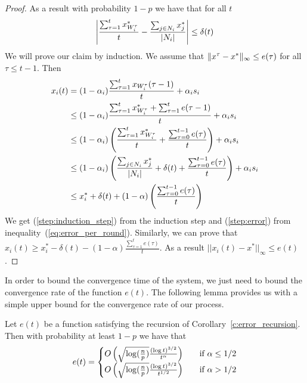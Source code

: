 \begin{proof}
  As a result with probability $1-p$ we have that for all $t$
  \begin{equation}\label{eq:error_per_round}
    \left|
    \frac{\sum_{\tau=1}^t x^*_{W_i^\tau}}{t} -
    \frac{\sum_{j \in N_i} x^*_j}{|N_i|}
    \right| \leq \delta(t)
  \end{equation}
  We will prove our claim by induction.
  We assume that $\| x^{\tau}-x^* \|_{\infty} \leq e(\tau)$ for all
  $\tau \leq t-1$. Then
  \begin{align}
    x_i(t)
    &=
    (1-\alpha_i)\frac{\sum_{\tau=1}^{t}x_{W_i^{\tau}}(\tau-1)}{t}
    + \alpha_i s_i \nonumber \\
    &\leq
    (1-\alpha_i)\frac{\sum_{\tau=1}^{t}x^*_{W_i^{\tau}} +
      \sum_{\tau=1}^{t} e(\tau-1)}{t} + \alpha_i s_i \label{step:induction_step}\\
    &\leq
    (1-\alpha_i)
    \left(
    \frac{\sum_{\tau=1}^{t}x^*_{W_i^{\tau}}}{t}+
    \frac{\sum_{\tau=0}^{t-1} e(\tau)}{t}
    \right)
    + \alpha_i s_i \nonumber\\
    &\leq
    (1-\alpha_i)\left(\frac{\sum_{j \in N_i}x^*_{j}}{|N_i|} +
    \delta(t) + \frac{\sum_{\tau=0}^{t-1} e(\tau)}{t} \right) +
    \alpha_i s_i \label{step:error} \\
    &\leq
    x_i^* + \delta(t) + (1-\alpha)
    \left(
    \frac{\sum_{\tau=0}^{t-1} e(\tau)}{t}
    \right)
    \nonumber
  \end{align}
  We get (\ref{step:induction_step}) from the induction step and
  (\ref{step:error}) from inequality~(\ref{eq:error_per_round}).
  Similarly, we can prove that
  $x_i(t) \geq x_i^* - \delta(t) - (1-\alpha)
  \frac{\sum_{\tau=1}^t e(\tau)}{t}$.
  As a result $||x_i(t)-x^*||_{\infty} \leq e(t)$.
\end{proof}

In order to bound the convergence time of the system, we just need to bound
the convergence rate of the function $e(t)$.
The following lemma provides us with a simple upper bound for the
convergence rate of our process.
\begin{lemma}\label{l:error_bound}
  Let $e(t)$ be a function satisfying the recursion of
  Corollary~\ref{c:error_recursion}. Then with probability
  at least $1-p$ we have that
  \[
    e(t) =
    \begin{cases}
      O\left(\sqrt{\log(\frac{n}{p})}\frac{(\log t)^{3/2}}{t^\alpha}\right)
      &\quad\text{if } \alpha \leq 1/2\\
      O\left(\sqrt{\log(\frac{n}{p})}\frac{(\log t)^{3/2}}{t^{1/2}}\right)
      &\quad\text{if } \alpha > 1/2\\
    \end{cases}
  \]
\end{lemma}

